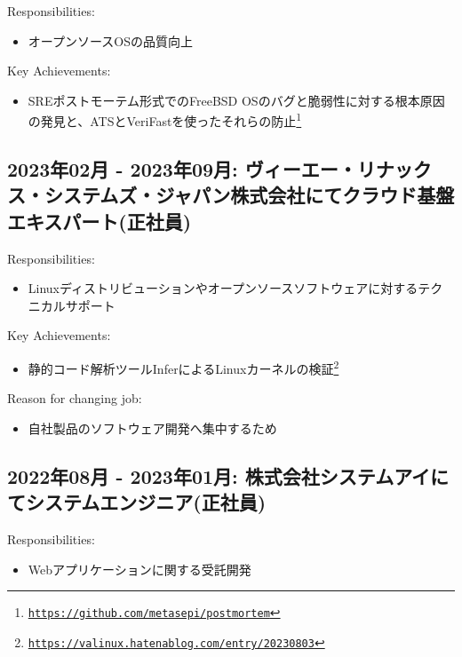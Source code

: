 \documentclass[letterpaper]{article}
\begin{document}
\noindent Responsibilities:

\begin{itemize}
  \item オープンソースOSの品質向上
\end{itemize}

\noindent Key Achievements:

\begin{itemize}
  \item SREポストモーテム形式でのFreeBSD OSのバグと脆弱性に対する根本原因の発見と、ATSとVeriFastを使ったそれらの防止\footnote{\href{https://github.com/metasepi/postmortem}{\tt https://github.com/metasepi/postmortem}}
\end{itemize}

\subsection*{2023年02月 - 2023年09月: ヴィーエー・リナックス・システムズ・ジャパン株式会社にてクラウド基盤エキスパート(正社員)}

\noindent Responsibilities:

\begin{itemize}
  \item Linuxディストリビューションやオープンソースソフトウェアに対するテクニカルサポート
\end{itemize}

\noindent Key Achievements:

\begin{itemize}
  \item 静的コード解析ツールInferによるLinuxカーネルの検証\footnote{\href{https://valinux.hatenablog.com/entry/20230803}{\tt https://valinux.hatenablog.com/entry/20230803}}
\end{itemize}

\noindent Reason for changing job:

\begin{itemize}
  \item 自社製品のソフトウェア開発へ集中するため
\end{itemize}

\subsection*{2022年08月 - 2023年01月: 株式会社システムアイにてシステムエンジニア(正社員)}

\noindent Responsibilities:

\begin{itemize}
  \item Webアプリケーションに関する受託開発
\end{itemize}
\end{document}
